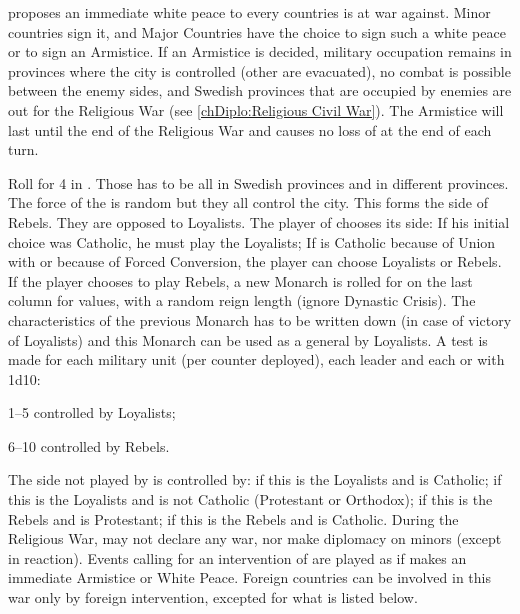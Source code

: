 

\condition{}
\aparag \SUE proposes an immediate white peace to every countries is at war
against.  Minor countries sign it, and Major Countries have the choice to sign
such a white peace or to sign an Armistice. If an Armistice is decided,
military occupation remains in provinces where the city is controlled (other
are evacuated), no combat is possible between the enemy sides, and Swedish
provinces that are occupied by enemies are out for the Religious War (see
\ref{chDiplo:Religious Civil War}). The Armistice will last until the end of
the Religious War and causes no loss of \STAB at the end of each turn.


\phevnt
\aparag Roll for 4 \REVOLT in \SUE. Those \REVOLT has to be all in Swedish
provinces and in different provinces. The force of the \REVOLT is random but
they all control the city.  This forms the side of Rebels. They are opposed to
Loyalists.
\aparag The player of \SUE chooses its side:
\bparag If his initial choice was Catholic, he must play the Loyalists;
\bparag If \SUE is Catholic because of Union with \POL or because of Forced
Conversion, the player can choose Loyalists or Rebels.
\bparag If the player chooses to play Rebels, a new Monarch is rolled for on
the last column for values, with a random reign length (ignore Dynastic
Crisis). The characteristics of the previous Monarch has to be written down
(in case of victory of Loyalists) and this Monarch can be used as a general by
Loyalists.
\aparag A test is made for each military unit (per counter deployed), each
leader and each \COL or \TP with 1d10:
\begin{modlist}
\item[1--5] controlled by Loyalists;
\item[6--10] controlled by Rebels.
\end{modlist}
\aparag The side not played by \SUE is controlled by:
\bparag \POL if this is the Loyalists and \POL is Catholic;
\bparag \HAB if this is the Loyalists and \POL is not Catholic (Protestant or
Orthodox);
\bparag \ENG if this is the Rebels and \ENG is Protestant;
\bparag \MAJHOL if this is the Rebels and \ENG is Catholic.
\aparag During the Religious War, \SUE may not declare any war, nor make
diplomacy on minors (except in reaction). Events calling for an intervention
of \SUE are played as if \SUE makes an immediate Armistice or White Peace.
\aparag Foreign countries can be involved in this war only by foreign
intervention, excepted for what is listed below.

